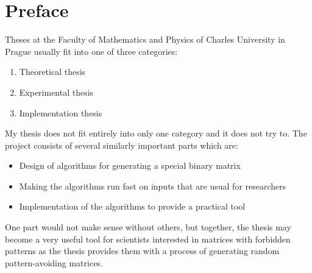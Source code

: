 \chapter*{Preface}
Theses at the Faculty of Mathematics and Physics of Charles University in Prague usually fit into one of three categories:
\begin{enumerate}
\item Theoretical thesis
\item Experimental thesis
\item Implementation thesis
\end{enumerate}
My thesis does not fit entirely into only one category and it does not try to. The project consists of several similarly important parts which are:
\begin{itemize}
\item Design of algorithms for generating a special binary matrix
\item Making the algorithms run fast on inputs that are usual for researchers
\item Implementation of the algorithms to provide a practical tool
\end{itemize}
One part would not make sense without others, but together, the thesis may become a very useful tool for scientists interested in matrices with forbidden patterns as the thesis provides them with a process of generating random pattern-avoiding matrices.
